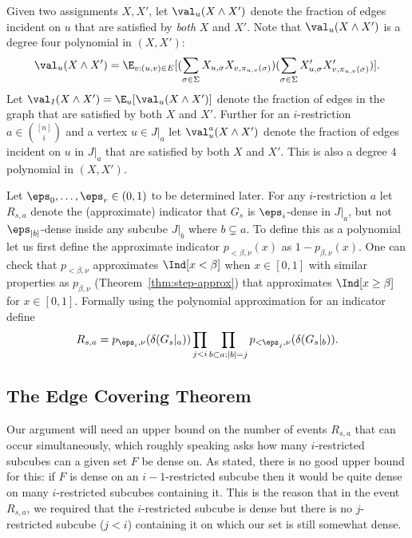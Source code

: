Given two assignments $X,X'$, let $\val_u(X \wedge X')$ denote the fraction of edges incident on $u$ that are satisfied by \emph{both} $X$ and $X'$. Note that $\val_u(X \wedge X')$ is a degree four polynomial in $(X,X')$: 
\[\val_u(X \wedge X') = \E_{v: (u,v) \in E}[(\sum_{\sigma \in \Sigma} X_{u,\sigma}X_{v,\pi_{u,v}(\sigma)})(\sum_{\sigma \in \Sigma} X'_{u,\sigma}X'_{v,\pi_{u,v}(\sigma)})].\]
Let $\val_I(X \wedge X') = \E_u[\val_u(X \wedge X')]$ denote the fraction of edges in the graph that are satisfied by both $X$ and $X'$. Further for an $i$-restriction $a \in {[n] \choose i}$ and a vertex $u \in J|_a$ let $\val^a_u(X \wedge X')$ denote the fraction of edges incident on $u$ in $J|_a$ that are satisfied by both $X$ and $X'$. This is also a degree $4$ polynomial in $(X,X')$.

\begin{definition}
Let $\eps_0,\ldots,\eps_r \in (0,1)$ to be determined later. For any $i$-restriction $a$ let $R_{s,a}$ denote the (approximate) indicator that $G_s$ is $\eps_i$-dense in $J|_a$, but not $\eps_{|b|}$-dense inside any subcube $J|_b$ where $b \subsetneq a$. To define this as a polynomial let us first define the approximate indicator $p_{<\beta,\nu}(x)$ as $1 - p_{\beta,\nu}(x)$. One can check that $p_{<\beta,\nu}$  approximates $\Ind[x < \beta]$ when $x \in [0,1]$ with similar properties as $p_{\beta,\nu}$ (Theorem~\ref{thm:step-approx}) that approximates $\Ind[x \geq \beta]$ for $x \in [0,1]$. Formally using the polynomial approximation for an indicator define 
\[R_{s,a} = p_{\eps_i,\nu}(\delta(G_s|_a))\prod_{j < i}\prod_{b \subset a: |b| = j}p_{<\eps_j,\nu}(\delta(G_s|_b)).\] 
\end{definition}


\subsection{The Edge Covering Theorem}
Our argument will need an upper bound on the number of
events $R_{s,a}$ that can occur simultaneously, which 
roughly speaking asks how many $i$-restricted subcubes can a given set $F$ be dense on. 
As stated, there is no good upper bound for this: 
if $F$ is dense on an $i-1$-restricted subcube
then it would be quite dense on many $i$-restricted subcubes containing it. This is the reason 
that in the event $R_{s,a}$, we required that the $i$-restricted subcube is dense but there is no $j$-restricted subcube ($j < i$) containing it on which our set is still somewhat dense.

